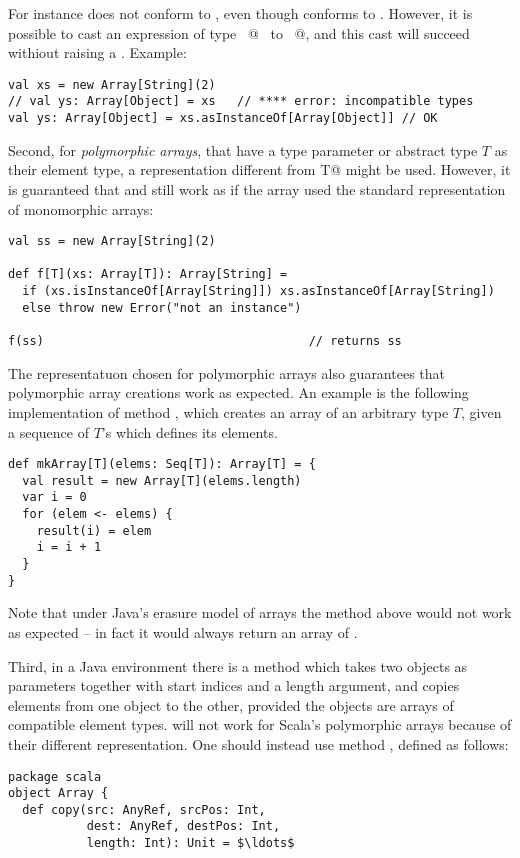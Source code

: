 {For instance  does not conform to
, even though  conforms to .
However, it is possible to cast an expression of type
~\lstinline@Array[String]@~ to ~\lstinline@Array[Object]@, and this
cast will succeed withiout raising a . Example:
\begin{lstlisting}
val xs = new Array[String](2)
// val ys: Array[Object] = xs   // **** error: incompatible types
val ys: Array[Object] = xs.asInstanceOf[Array[Object]] // OK
\end{lstlisting}

Second, for {\em polymorphic arrays}, that have a type parameter or
abstract type $T$ as their element type, a representation different
from
\lstinline@[]T@ might be used. However, it is guaranteed that 
 and  still work as if the array 
used the standard representation of monomorphic arrays:
\begin{lstlisting}
val ss = new Array[String](2)

def f[T](xs: Array[T]): Array[String] = 
  if (xs.isInstanceOf[Array[String]]) xs.asInstanceOf[Array[String])
  else throw new Error("not an instance")

f(ss)                                     // returns ss
\end{lstlisting}
The representatuon chosen for polymorphic arrays also guarantees that
polymorphic array creations work as expected. An example is the
following implementation of method \lstinline@mkArray@, which creates
an array of an arbitrary type $T$, given a sequence of $T$'s which
defines its elements.
\begin{lstlisting}
def mkArray[T](elems: Seq[T]): Array[T] = {
  val result = new Array[T](elems.length)
  var i = 0
  for (elem <- elems) {
    result(i) = elem
    i = i + 1
  }
}
\end{lstlisting}
Note that under Java's erasure model of arrays the method above would
not work as expected -- in fact it would always return an array of
\lstinline@Object@.

Third, in a Java environment there is a method 
which takes two objects as parameters together with start indices and
a length argument, and copies elements from one object to the other,
provided the objects are arrays of compatible element
types.  will not work for Scala's polymorphic
arrays because of their different representation. One should instead
use method , defined as follows:
\begin{lstlisting}
package scala
object Array { 
  def copy(src: AnyRef, srcPos: Int, 
           dest: AnyRef, destPos: Int, 
           length: Int): Unit = $\ldots$
\end{lstlisting}

}
